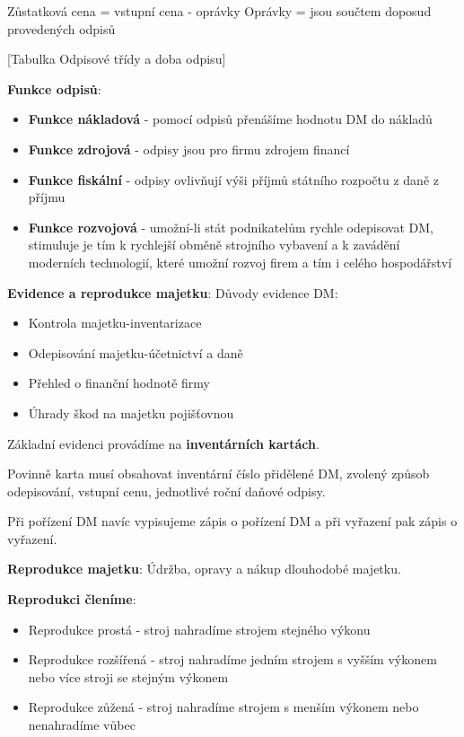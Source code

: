 \begin{center}
Zůstatková cena = vstupní cena - oprávky
Oprávky = jsou součtem doposud provedených odpisů	
\end{center}

[Tabulka Odpisové třídy a doba odpisu]

\textbf{Funkce odpisů}:
\begin{itemize}
    \item \textbf{Funkce nákladová} - pomocí odpisů přenášíme hodnotu DM do nákladů
    \item \textbf{Funkce zdrojová} - odpisy jsou pro firmu zdrojem financí
    \item \textbf{Funkce fiskální} - odpisy ovlivňují výši příjmů státního rozpočtu z daně z příjmu
    \item \textbf{Funkce rozvojová} - umožní-li stát podnikatelům rychle odepisovat DM, stimuluje je tím k rychlejší obměně strojního vybavení a k zavádění moderních technologií, které umožní rozvoj firem a tím i celého hospodářství
\end{itemize}

\textbf{Evidence a reprodukce majetku}:
Důvody evidence DM:
\begin{itemize}
    \item Kontrola majetku-inventarizace
    \item Odepisování majetku-účetnictví a daně
    \item Přehled o finanční hodnotě firmy
    \item Úhrady škod na majetku pojišťovnou
\end{itemize}

Základní evidenci provádíme na \textbf{inventárních kartách}.

Povinně karta musí obsahovat inventární číslo přidělené DM, zvolený způsob odepisování, vstupní cenu, jednotlivé roční daňové odpisy.

Při pořízení DM navíc vypisujeme zápis o pořízení DM a při vyřazení pak zápis o vyřazení.

\textbf{Reprodukce majetku}:
Údržba, opravy a nákup dlouhodobé majetku.

\textbf{Reprodukci členíme}:
\begin{itemize}
    \item Reprodukce prostá - stroj nahradíme strojem stejného výkonu
    \item Reprodukce rozšířená - stroj nahradíme jedním strojem s vyšším výkonem nebo více stroji se stejným výkonem
    \item Reprodukce zůžená - stroj nahradíme strojem s menším výkonem nebo nenahradíme vůbec
\end{itemize}


